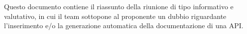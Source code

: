 Questo documento contiene il riassunto della riunione di tipo informativo e valutativo, in cui il team sottopone al proponente un dubbio riguardante l'inserimento e/o la generazione automatica della documentazione di una API.
